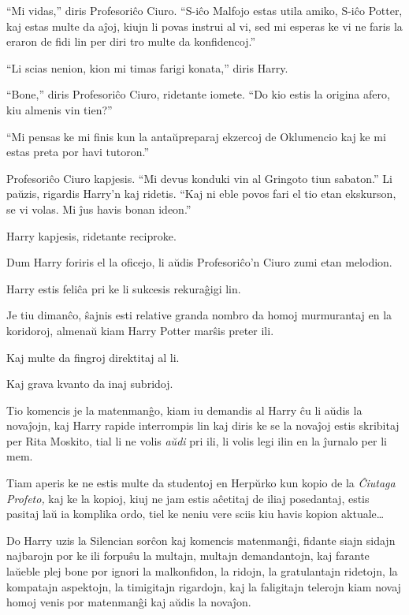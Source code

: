 ``Mi vidas,'' diris Profesoriĉo Ciuro. ``S-iĉo Malfojo estas utila
amiko, S-iĉo Potter, kaj estas multe da aĵoj, kiujn li povas instrui
al vi, sed mi esperas ke vi ne faris la eraron de fidi lin per diri
tro multe da konfidencoj.''

``Li scias nenion, kion mi timas farigi konata,'' diris Harry.

``Bone,'' diris Profesoriĉo Ciuro, ridetante iomete. ``Do kio estis la
origina afero, kiu almenis vin tien?''

``Mi pensas ke mi finis kun la antaŭpreparaj ekzercoj de Oklumencio
kaj ke mi estas preta por havi tutoron.''

Profesoriĉo Ciuro kapjesis. ``Mi devus konduki vin al Gringoto tiun
sabaton.'' Li paŭzis, rigardis Harry'n kaj ridetis. ``Kaj ni eble povos
fari el tio etan ekskurson, se vi volas. Mi ĵus havis bonan ideon.''

Harry kapjesis, ridetante reciproke.

Dum Harry foriris el la oficejo, li aŭdis Profesoriĉo'n Ciuro zumi etan melodion.

Harry estis feliĉa pri ke li sukcesis rekuraĝigi lin.

\later

Je tiu dimanĉo, ŝajnis esti relative granda nombro da homoj murmurantaj
en la koridoroj, almenaŭ kiam Harry Potter marŝis preter ili.

Kaj multe da fingroj direktitaj al li.

Kaj grava kvanto da inaj subridoj.

Tio komencis je la matenmanĝo, kiam iu demandis al Harry ĉu li aŭdis
la novaĵojn, kaj Harry rapide interrompis lin kaj diris ke se la
novaĵoj estis skribitaj per Rita Moskito, tial li ne volis
\emph{aŭdi} pri ili, li volis legi ilin en la ĵurnalo per li mem.

Tiam aperis ke ne estis multe da studentoj en Herpŭrko kun kopio de la
\emph{Ĉiutaga Profeto,} kaj ke la kopioj, kiuj ne jam estis aĉetitaj
de iliaj posedantaj, estis pasitaj laŭ ia komplika ordo, tiel ke neniu
vere sciis kiu havis kopion aktuale\ldots{}

Do Harry uzis la Silencian sorĉon kaj komencis matenmanĝi, fidante
siajn sidajn najbarojn por ke ili forpuŝu la multajn, multajn
demandantojn, kaj farante laŭeble plej bone por ignori la malkonfidon,
la ridojn, la gratulantajn ridetojn, la kompatajn aspektojn, la
timigitajn rigardojn, kaj la faligitajn telerojn kiam novaj homoj
venis por matenmanĝi kaj aŭdis la novaĵon.

